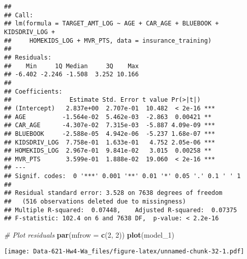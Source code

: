 \documentclass[
]{article}
\newenvironment{Shaded}{\begin{snugshade}}{\end{snugshade}}
\newcommand{\AttributeTok}[1]{\textcolor[rgb]{0.13,0.29,0.53}{#1}}
\newcommand{\CommentTok}[1]{\textcolor[rgb]{0.56,0.35,0.01}{\textit{#1}}}
\newcommand{\DecValTok}[1]{\textcolor[rgb]{0.00,0.00,0.81}{#1}}
\newcommand{\FunctionTok}[1]{\textcolor[rgb]{0.13,0.29,0.53}{\textbf{#1}}}
\newcommand{\NormalTok}[1]{#1}
\newcommand{\OtherTok}[1]{\textcolor[rgb]{0.56,0.35,0.01}{#1}}
\newcommand{\SpecialCharTok}[1]{\textcolor[rgb]{0.81,0.36,0.00}{\textbf{#1}}}
\newcommand{\StringTok}[1]{\textcolor[rgb]{0.31,0.60,0.02}{#1}}
\begin{document}
\begin{verbatim}
## 
## Call:
## lm(formula = TARGET_AMT_LOG ~ AGE + CAR_AGE + BLUEBOOK + KIDSDRIV_LOG + 
##     HOMEKIDS_LOG + MVR_PTS, data = insurance_training)
## 
## Residuals:
##    Min     1Q Median     3Q    Max 
## -6.402 -2.246 -1.508  3.252 10.166 
## 
## Coefficients:
##                Estimate Std. Error t value Pr(>|t|)    
## (Intercept)   2.837e+00  2.707e-01  10.482  < 2e-16 ***
## AGE          -1.564e-02  5.462e-03  -2.863  0.00421 ** 
## CAR_AGE      -4.307e-02  7.315e-03  -5.887 4.09e-09 ***
## BLUEBOOK     -2.588e-05  4.942e-06  -5.237 1.68e-07 ***
## KIDSDRIV_LOG  7.758e-01  1.633e-01   4.752 2.05e-06 ***
## HOMEKIDS_LOG  2.967e-01  9.841e-02   3.015  0.00258 ** 
## MVR_PTS       3.599e-01  1.888e-02  19.060  < 2e-16 ***
## ---
## Signif. codes:  0 '***' 0.001 '**' 0.01 '*' 0.05 '.' 0.1 ' ' 1
## 
## Residual standard error: 3.528 on 7638 degrees of freedom
##   (516 observations deleted due to missingness)
## Multiple R-squared:  0.07448,    Adjusted R-squared:  0.07375 
## F-statistic: 102.4 on 6 and 7638 DF,  p-value: < 2.2e-16
\end{verbatim}

\begin{Shaded}
\begin{Highlighting}[]
\CommentTok{\# Plot residuals}
\FunctionTok{par}\NormalTok{(}\AttributeTok{mfrow =} \FunctionTok{c}\NormalTok{(}\DecValTok{2}\NormalTok{, }\DecValTok{2}\NormalTok{))}
\FunctionTok{plot}\NormalTok{(model\_1)}
\end{Highlighting}
\end{Shaded}

\texttt{[image: Data-621-Hw4-Wa\_files/figure-latex/unnamed-chunk-32-1.pdf]}

\begin{Shaded}
\end{Shaded}
\end{document}
